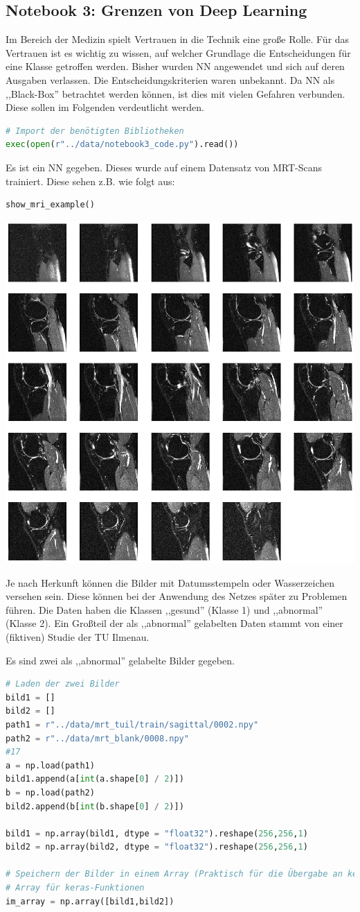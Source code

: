 \documentclass[a4paper,10pt,titlepage]{scrartcl}
\begin{document}
\subsection{Notebook 3: Grenzen von Deep Learning}
Im Bereich der Medizin spielt Vertrauen in die Technik eine große Rolle. Für das Vertrauen ist es wichtig zu wissen, auf welcher Grundlage die Entscheidungen für eine Klasse getroffen werden. Bisher wurden NN angewendet und sich auf deren Ausgaben verlassen. Die Entscheidungskriterien waren unbekannt. Da NN als ,,Black-Box'' betrachtet werden können, ist dies mit vielen Gefahren verbunden. Diese sollen im Folgenden verdeutlicht werden.

\begin{lstlisting}[language=python]
# Import der benötigten Bibliotheken
exec(open(r"../data/notebook3_code.py").read())
\end{lstlisting}

Es ist ein NN gegeben. Dieses wurde auf einem Datensatz von MRT-Scans trainiert. Diese sehen z.B. wie folgt aus:

\begin{lstlisting}[language=python]
show_mri_example()
\end{lstlisting}
\begin{center}
    \includegraphics[width=.3\linewidth]{Assets/prakBMT-DeepLearning-05.png}
\end{center}

Je nach Herkunft können die Bilder mit Datumsstempeln oder Wasserzeichen versehen sein. Diese können bei der Anwendung des Netzes später zu Problemen führen.
Die Daten haben die Klassen ,,gesund'' (Klasse 1)  und ,,abnormal'' (Klasse 2). Ein Großteil der als ,,abnormal'' gelabelten Daten stammt von einer (fiktiven) Studie der TU Ilmenau.

Es sind zwei als ,,abnormal'' gelabelte Bilder gegeben.

\begin{lstlisting}[language=python]
# Laden der zwei Bilder
bild1 = []
bild2 = []
path1 = r"../data/mrt_tuil/train/sagittal/0002.npy"
path2 = r"../data/mrt_blank/0008.npy"
#17
a = np.load(path1)
bild1.append(a[int(a.shape[0] / 2)])
b = np.load(path2)
bild2.append(b[int(b.shape[0] / 2)])

bild1 = np.array(bild1, dtype = "float32").reshape(256,256,1)
bild2 = np.array(bild2, dtype = "float32").reshape(256,256,1)

# Speichern der Bilder in einem Array (Praktisch für die Übergabe an keras-Funktionen)
# Array für keras-Funktionen
im_array = np.array([bild1,bild2])
\end{lstlisting}
\end{document}

